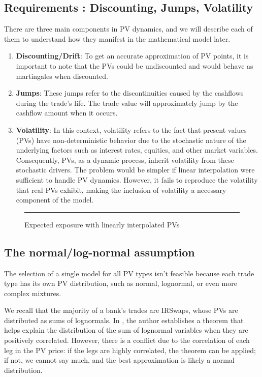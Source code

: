 \documentclass{article}
\begin{document}
\subsection{Requirements : Discounting, Jumps, Volatility}

There are three main components in PV dynamics, and we will describe each of them to understand how they manifest in the mathematical model later.

\begin{enumerate}
    \item \textbf{Discounting/Drift}: To get an accurate approximation of PV points, it is important to note that the PVs could be undiscounted and would behave as martingales when discounted.
    
    \item \textbf{Jumps}: These jumps refer to the discontinuities caused by the cashflows during the trade's life. The trade value will approximately jump by the cashflow amount when it occurs.
    
    \item \textbf{Volatility}: In this context, volatility refers to the fact that present values (PVs) have non-deterministic behavior due to the stochastic nature of the underlying factors such as interest rates, equities, and other market variables. Consequently, PVs, as a dynamic process, inherit volatility from these stochastic drivers. The problem would be simpler if linear interpolation were sufficient to handle PV dynamics. However, it fails to reproduce the volatility that real PVs exhibit, making the inclusion of volatility a necessary component of the model.
\end{enumerate}

\begin{figure}[H]
    \centering
    \rule{0.8\textwidth}{0.35\textheight} %
    \caption{Expected exposure with linearly interpolated PVs}
\end{figure}

\subsection{The normal/log-normal assumption} \label{sec:assumption}

The selection of a single model for all PV types isn't feasible because each trade type has its own PV distribution, such as normal, lognormal, or even more complex mixtures. 

We recall that the majority of a bank's trades are IRSwaps, whose PVs are distributed as sums of lognormals. In \cite{szyszkowicz2009limit}, the author establishes a theorem that helps explain the distribution of the sum of lognormal variables when they are positively correlated. However, there is a conflict due to the correlation of each leg in the PV price: if the legs are highly correlated, the theorem can be applied; if not, we cannot say much, and the best approximation is likely a normal distribution.
\end{document}
